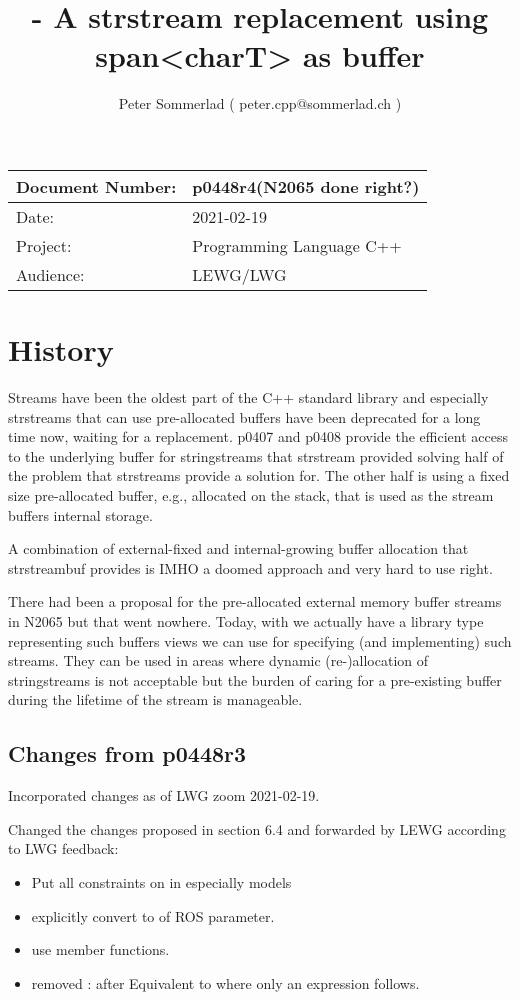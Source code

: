 \documentclass[ebook,11pt,article]{memoir}
\title{\papernumber{} - A strstream replacement using span\textless{}charT\textgreater{} as buffer}
\author{Peter Sommerlad 
( peter.cpp@sommerlad.ch )}
\date{\paperdate}                %
\newcommand{\papernumber}{p0448r4}
\newcommand{\paperdate}{2021-02-19}
\begin{document}
\maketitle
\begin{center}
\begin{tabular}[t]{|l|l|}\hline 
Document Number:&  \papernumber \hfill (N2065 done right?)\\\hline
Date: & \paperdate \\\hline
Project: & Programming Language C++\\\hline 
Audience: & LEWG/LWG\\\hline
\end{tabular}
\end{center}
\chapter{History}
Streams have been the oldest part of the C++ standard library and especially strstreams that can use pre-allocated buffers have been deprecated for a long time now, waiting for a replacement. p0407 and p0408 provide the efficient access to the underlying buffer for stringstreams that strstream provided solving half of the problem that strstreams provide a solution for. The other half is using a fixed size pre-allocated buffer, e.g., allocated on the stack, that is used as the stream buffers internal storage.

A combination of external-fixed and internal-growing buffer allocation that strstreambuf provides is IMHO a doomed approach and very hard to use right.

There had been a proposal for the pre-allocated external memory buffer streams in N2065 but that went nowhere. Today, with  we actually have a library type representing such buffers views we can use for specifying (and implementing) such streams. They can be used in areas where dynamic (re-)allocation of stringstreams is not acceptable but the burden of caring for a pre-existing buffer during the lifetime of the stream is manageable. 

\section{Changes from p0448r3}

Incorporated changes as of LWG zoom 2021-02-19. 

Changed the changes proposed in section 6.4 and forwarded by LEWG according to LWG feedback:
\begin{itemize}
\item Put all constraints on  in \constraints especially  models 
\item explicitly convert to  of ROS parameter.
\item use   member functions.
\item removed : after Equivalent to where only an expression follows.
\end{itemize}
\end{document}
